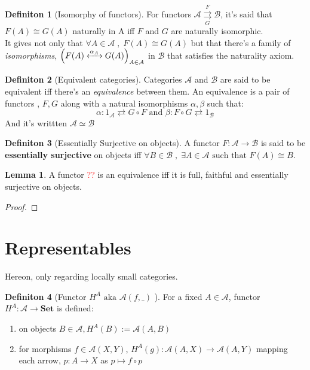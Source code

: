 \documentclass{article}
\theoremstyle{definition}
\theoremstyle{definition}
\newtheorem{definition}{Definiton}[section]
\theoremstyle{definition}
\newtheorem{lemma}{Lemma}[section]
\theoremstyle{definition}
\begin{document}
\begin{definition}[Isomorphy of functors] %
	For functors $\mathcal{A} \overset{F}{\underset{G}{\rightrightarrows}} \mathcal{B} $, it's said that $F(A) \cong G(A) $ naturally in A iff $F$ and $G$ are naturally isomorphic. \\
	It gives not only that $\forall A \in \mathcal{A}\; , \;  F(A) \cong G(A)$ but that there's a family of \textit{isomorphisms}, $\Big( F(A)\xleftrightarrow{\alpha_A \;} G(A) \Big)_{A \in \mathcal{A} }$ in $\mathcal{B} $ that satisfies the naturality axiom.
\end{definition}

\begin{definition}[Equivalent categories] %
	Categories $\mathcal{A}$ and $\mathcal{B} $ are said to be equivalent iff there's an \textit{equivalence} between them.
	An equivalence is  a pair of functors , $F,G$ along with a natural isomorphisms $\alpha, \beta$ such that:
	\[ \alpha: 1_{\mathcal{A} } \rightleftarrows G \circ F \text{ and } \beta: F \circ G \rightleftarrows 1_{\mathcal{B} } \]
	And it's writtten $\mathcal{A} \simeq \mathcal{B} $
\end{definition}

\begin{definition}[Essentially Surjective on objects] %
	A functor $F: \mathcal{A} \rightarrow \mathcal{B} $ is said to be \textbf{essentially surjective} on objects iff
	$ \forall B \in \mathcal{B} \; , \; \exists A \in \mathcal{A} \text{ such that } F(A) \cong B $.
\end{definition}
\begin{lemma}
	A functor \textcolor{red}{??} is an equivalence iff it is full, faithful and essentially surjective on objects.
	\begin{proof}

	\end{proof}
\end{lemma}



\section{Representables}
\label{sec:Representables}
Hereon, only regarding locally small categories.

\begin{definition}[Functor $H^A \text{ aka } \mathcal{A} (f , \_ )$ ] %
	For a fixed $A \in \mathcal{A}$, functor $H^A: \mathcal{A} \rightarrow \textbf{Set}$ is defined:
	\begin{enumerate}[label=\roman*]
		\item on objects $B \in \mathcal{A}, H^A(B) := \mathcal{A}(A,B) $
		\item for morphisms $f \in \mathcal{A}(X,Y)$,  $H^A(g):\mathcal{A}(A,X) \rightarrow \mathcal{A}(A,Y)$
			mapping each arrow, $p:A \rightarrow X$ as $p \mapsto f \circ p$
	\end{enumerate}

\end{definition}
\end{document}
